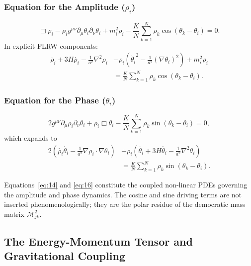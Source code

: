 \subsubsection*{Equation for the Amplitude ($\rho_i$)}
\begin{equation}
\Box\rho_i - \rho_i g^{\mu\nu}\partial_\mu\theta_i\partial_\nu\theta_i + m_i^2\rho_i
- \frac{K}{N}\sum_{k=1}^N\rho_k\cos(\theta_k-\theta_i) = 0 .
\end{equation}
In explicit FLRW components:
\begin{equation}
{
\begin{aligned}
\ddot{\rho_i} + 3H\dot{\rho_i} - \frac{1}{a^2}\nabla^2\rho_i
&- \rho_i\!\left(\dot{\theta_i}^2 - \frac{1}{a^2}(\nabla\theta_i)^2\right)
+ m_i^2\rho_i \\
&= \frac{K}{N}\sum_{k=1}^N\rho_k\cos(\theta_k-\theta_i) .
\end{aligned}
} \tag{14} \label{eq:14}
\end{equation}

\subsubsection*{Equation for the Phase ($\theta_i$)}
\begin{equation}
2g^{\mu\nu}\partial_\mu\rho_i\partial_\nu\theta_i + \rho_i\Box\theta_i
- \frac{K}{N}\sum_{k=1}^N\rho_k\sin(\theta_k-\theta_i) = 0 ,
\end{equation}
which expands to
\begin{equation}
{
\begin{aligned}
2\!\left(\dot{\rho_i}\dot{\theta_i} - \frac{1}{a^2}\nabla\rho_i\!\cdot\!\nabla\theta_i\right)
&+ \rho_i\!\left(\ddot{\theta_i} + 3H\dot{\theta_i} - \frac{1}{a^2}\nabla^2\theta_i\right) \\
&= \frac{K}{N}\sum_{k=1}^N\rho_k\sin(\theta_k-\theta_i) .
\end{aligned}
} \tag{16} \label{eq:16}
\end{equation}

Equations~\eqref{eq:14} and \eqref{eq:16} constitute the coupled non-linear PDEs governing the amplitude and phase dynamics. The cosine and sine driving terms are not inserted phenomenologically; they are the polar residue of the democratic mass matrix $\mathcal{M}^2_{jk}$.

\subsection{The Energy-Momentum Tensor and Gravitational Coupling}
\label{subsec:emt}

